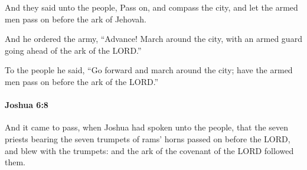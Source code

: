 			\begin{versebox}
					\item[BHS] 
					\item[ASV] And they said unto the people, Pass on, and compass the city, and let the armed men pass on before the ark of Jehovah.
					\item[NIV] And he ordered the army, “Advance! March around the city, with an armed guard going ahead of the ark of the LORD.”
					\item[NRSV] To the people he said, “Go forward and march around the city; have the armed men pass on before the ark of the LORD.”
			\end{versebox}

		\paragraph{Joshua 6:8} %
			\label{JOSHUA-6-8}

			And it came to pass, when Joshua had spoken unto the people, that the seven priests bearing the seven trumpets of rams’ horns passed on before the LORD, and blew with the trumpets: and the ark of the covenant of the LORD followed them.

